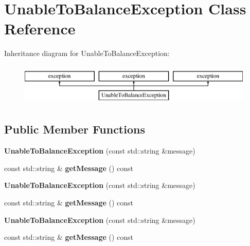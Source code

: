 \hypertarget{class_unable_to_balance_exception}{}\section{Unable\+To\+Balance\+Exception Class Reference}
\label{class_unable_to_balance_exception}
Inheritance diagram for Unable\+To\+Balance\+Exception\+:\begin{figure}[H]
\begin{center}
\leavevmode
\includegraphics[height=2.000000cm]{d6/d75/class_unable_to_balance_exception}
\end{center}
\end{figure}
\subsection*{Public Member Functions}
\begin{DoxyCompactItemize}
\item 
\mbox{\label{class_unable_to_balance_exception_a4163beabd88841279e309a9b48732ff6}} 
{\bfseries Unable\+To\+Balance\+Exception} (const std\+::string \&message)
\item 
\mbox{\label{class_unable_to_balance_exception_a1c80cdcd89be8404789735f8f87f2bc5}} 
const std\+::string \& {\bfseries get\+Message} () const
\item 
\mbox{\label{class_unable_to_balance_exception_a4163beabd88841279e309a9b48732ff6}} 
{\bfseries Unable\+To\+Balance\+Exception} (const std\+::string \&message)
\item 
\mbox{\label{class_unable_to_balance_exception_aeb9dbc529b0e66d7d5cb1de9f2529a5c}} 
const std\+::string \& {\bfseries get\+Message} () const
\item 
\mbox{\label{class_unable_to_balance_exception_a4163beabd88841279e309a9b48732ff6}} 
{\bfseries Unable\+To\+Balance\+Exception} (const std\+::string \&message)
\item 
\mbox{\label{class_unable_to_balance_exception_aeb9dbc529b0e66d7d5cb1de9f2529a5c}} 
const std\+::string \& {\bfseries get\+Message} () const
\end{DoxyCompactItemize}
